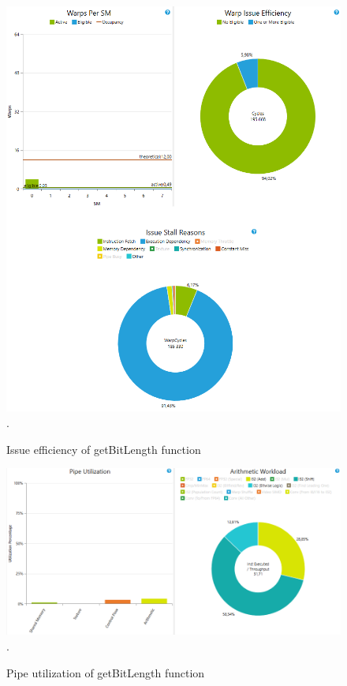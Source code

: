 \documentclass[oneside,openright,12pt,final,en]{mgr}
\begin{document}
\begin{figure}[H]
	\centering
	\includegraphics[width=\textwidth]{bitlength_issue}.
	\caption{Issue efficiency of getBitLength function}
	\label{fig:bitlength_issue}
\end{figure}

\begin{figure}[H]
	\centering
	\includegraphics[width=\textwidth]{bitlength_pipe}.
	\caption{Pipe utilization of getBitLength function}
	\label{fig:bitlength_pipe}
\end{figure}
\end{document}
